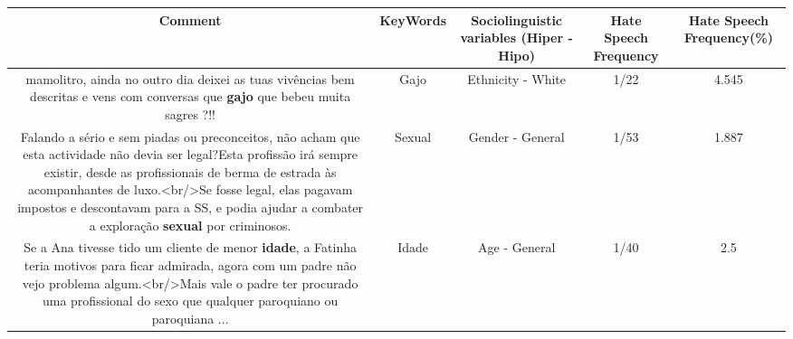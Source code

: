 \documentclass[11pt]{article}
\newlength\mylength
\begin{document}
\begin{center}
\setlength\mylength{\dimexpr\textwidth - 1\arrayrulewidth - 50\tabcolsep}
\begin{longtable}{|C{.65\mylength}|C{.30\mylength}|C{.12\mylength}|C{.12\mylength}|C{.12\mylength}|}
\hline
\textbf{Comment} & \textbf{KeyWords} & \textbf{Sociolinguistic variables (Hiper - Hipo)}  & \textbf{Hate Speech Frequency} & \textbf{Hate Speech Frequency(\%)} \\
\hline{}\small mamolitro, ainda no outro dia deixei as tuas vivências bem descritas e vens com conversas que \textbf{gajo} que bebeu muita sagres ?!!\normalsize   & Gajo & Ethnicity - White & 1/22 & 4.545 \\  \hline
  \small Falando a sério e sem piadas ou preconceitos, não acham que esta actividade não devia ser legal?Esta profissão irá sempre existir, desde as profissionais de berma de estrada às acompanhantes de luxo.<br/>Se fosse legal, elas pagavam impostos e descontavam para a SS, e podia ajudar a combater a exploração \textbf{sexual} por criminosos.\normalsize   & Sexual & Gender - General & 1/53 & 1.887 \\  \hline
  \small Se a Ana tivesse tido  um cliente  de menor \textbf{idade},  a Fatinha teria motivos para ficar admirada, agora com um padre não vejo problema algum.<br/>Mais vale o padre ter procurado uma profissional do sexo que qualquer paroquiano ou paroquiana ...\normalsize   & Idade & Age - General & 1/40 & 2.5 \\  \hline

\end{longtable}
\end{center}
\end{document}
